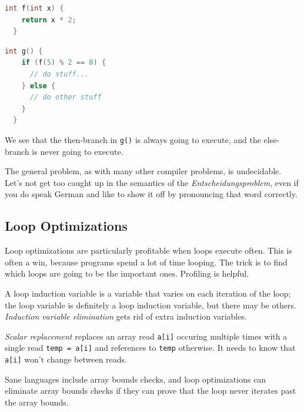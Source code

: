 \documentclass[a4paper]{report}
\begin{document}
{\scriptsize
\begin{center}
\vspace*{-2em}
\begin{minipage}{.3\textwidth}
\begin{lstlisting}[language=C]
  int f(int x) {
    return x * 2;
  }
  \end{lstlisting}
  \end{minipage} \begin{minipage}{.3\textwidth}
\begin{lstlisting}[language=C]
  int g() {
    if (f(5) % 2 == 0) {
      // do stuff...
    } else {
      // do other stuff
    }
  }
\end{lstlisting}
\end{minipage}
\end{center}
}
We see that the then-branch in {\tt g()} is always going to execute, and the
else-branch is never going to execute.

The general problem, as with many other compiler problems, is undecidable. Let's not get too caught up in the semantics of the \textit{Entscheidungsproblem}, even if you do speak German and like to show it off by pronouncing that word correctly.

\subsection*{Loop Optimizations}
Loop optimizations are particularly profitable when loops execute
often. This is often a win, because programs spend a lot of time looping.
The trick is to find which loops are going to be the important ones.
Profiling is helpful.

A loop induction variable is a variable that varies on each iteration
of the loop; the loop variable is definitely a loop induction variable,
but there may be others. \emph{Induction variable elimination} gets
rid of extra induction variables.

\emph{Scalar replacement} replaces an array read {\tt a[i]}
occuring multiple times with a single read {\tt temp = a[i]} and references
to {\tt temp} otherwise. It needs to know that {\tt a[i]} won't change
between reads.

Sane languages include array bounds checks, and loop optimizations
can eliminate array bounds checks if they can prove that the loop
never iterates past the array bounds.
\end{document}
